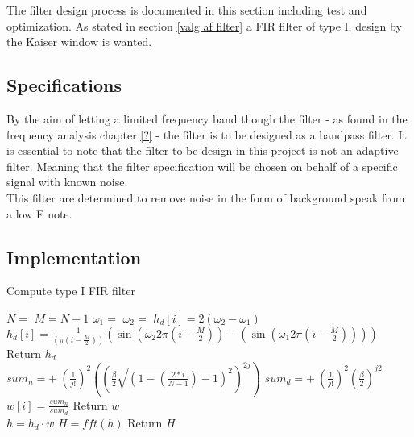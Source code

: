 The filter design process is documented in this section including test and optimization. As stated in section \ref{valg af filter} a FIR filter of type I, design by the Kaiser window is wanted.
\subsection{Specifications} 
By the aim of letting a limited frequency band though the filter - as found in the frequency analysis chapter \ref{?} - the filter is to be designed as a bandpass filter. It is essential to note that the filter to be design in this project is not an adaptive filter. Meaning that the filter specification will be chosen on behalf of a specific signal with known noise.\\
This filter are determined to remove noise in the form of background speak from a low E note.     
\subsection{Implementation}
\begin{algorithm}[H]
\caption{Compute type I FIR filter}
\label{array-sum}
\begin{algorithmic}[1] 
\State $N = $  
\State $M = N-1$ 
\State $\omega_1 = $ 
\State $\omega_2 = $ 
        		\State $h_d[i] = 2(\omega_2 - \omega_1)$
        	\Else 
        		\State  $h_d[i] = \frac{1}{ (\pi (i - \frac{M}{2}))}(\sin(\omega_2 2 \pi (i - \frac{M}{2})) - (\sin(\omega_1 2 \pi (i - \frac{M}{2}))))$ 
        	\EndIf 
	\EndFor
	\State Return $h_d$
\EndProcedure
\\
			\State $ sum_n = + \ (\frac{1}{j!})^2 \left( \left( \frac{\beta}{2} \sqrt{\left(1 - \left( \frac{2*i}{N-1}\right) - 1\right)^2}\right)^{2j}\right)$
			\State $ sum_d = + \ (\frac{1}{j!})^2 \left( \frac{\beta}{2}\right)^{j2}$
		\EndFor
		\State $w[i]=\frac{sum_n}{sum_d}$
	\EndFor
	\State Return $w$
\EndProcedure 
\\
	\State $h = h_d \cdot w$ 
	\State $H = fft(h)$ 
	\State Return $H$
\EndProcedure

\end{algorithmic}
\end{algorithm}